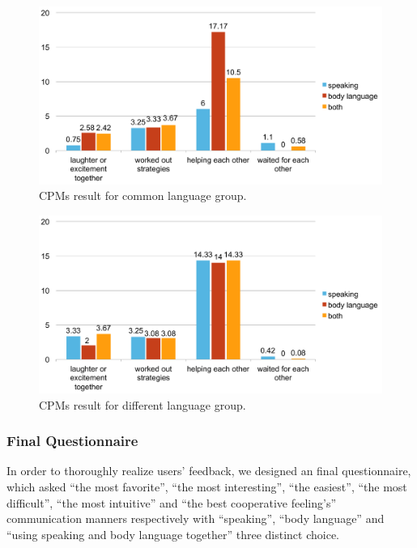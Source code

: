 

\begin{figure}[!h]
\centering
\includegraphics[width=0.9\columnwidth]{Figures/US_CPMs_Com.pdf}
\caption{CPMs result for common language group.}
\label{fig:US_CPMs_Com}
\end{figure}

\begin{figure}[!h]
\centering
\includegraphics[width=0.9\columnwidth]{Figures/US_CPMs_Dif.pdf}
\caption{CPMs result for different language group.}
\label{fig:US_CPMs_Dif}
\end{figure}


\subsubsection{Final Questionnaire}
In order to thoroughly realize users' feedback, we designed an final questionnaire, which asked ``the most favorite'', ``the most interesting'', ``the easiest'', ``the most difficult'', ``the most intuitive'' and ``the best cooperative feeling's'' communication manners respectively with ``speaking'', ``body language'' and ``using speaking and body language together'' three distinct choice.

